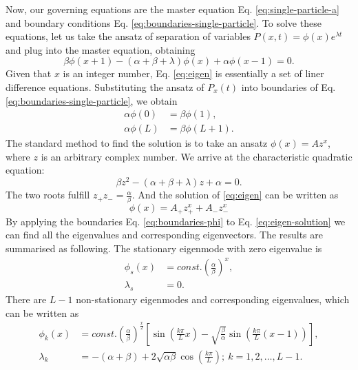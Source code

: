 Now, our governing equations are the master equation Eq. \eqref{eq:single-particle-a} and boundary conditions Eq. \eqref{eq:boundaries-single-particle}. To solve these equations, let us take the ansatz of separation of variables $P(x,t) = \phi(x)e^{\lambda t}$ and plug into the master equation, obtaining 
\begin{equation}
    \label{eq:eigen}
    \beta\phi(x+1) -(\alpha+\beta+\lambda)\phi(x) + \alpha\phi(x-1) = 0.
\end{equation}
Given that $x$ is an integer number, Eq. \eqref{eq:eigen} is essentially a set of liner difference equations. Substituting the ansatz of $P_x(t)$ into boundaries of Eq. \eqref{eq:boundaries-single-particle}, we obtain
\begin{subequations}
    \label{eq:boundaries-phi}
    \begin{align}
        \alpha\phi(0) &= \beta\phi(1), \\
        \alpha \phi(L) &= \beta \phi(L+1).
    \end{align}
\end{subequations}
The standard method to find the solution is to take an ansatz $\phi(x) = Az^x$, where $z$ is an arbitrary complex number. We arrive at the characteristic quadratic equation:
\begin{equation}
    \label{eq:characteristic}
    \beta z^2 - (\alpha + \beta + \lambda ) z + \alpha = 0.
\end{equation}
The two roots fulfill $z_+z_- = \frac{\alpha}{\beta}$. And the solution of \eqref{eq:eigen} can be written as 
\begin{equation}
    \label{eq:eigen-solution}
    \phi(x) = A_+ z_+^{x} + A_- z_-^{x}
\end{equation}
By applying the boundaries Eq. \eqref{eq:boundaries-phi} to Eq. \eqref{eq:eigen-solution} we can find all the eigenvalues and corresponding eigenvectors. The results are summarised as following. The stationary eigenmode with zero eigenvalue is
\begin{subequations}
    \label{eq:single-particle-stationary}
    \begin{align}
        \phi_s(x) & = const. \left(\frac{\alpha}{\beta}\right)^{x}, \\
        \lambda_s & = 0. 
    \end{align}
\end{subequations}
There are $L-1$ non-stationary eigenmodes and corresponding eigenvalues, which can be written as
\begin{subequations}
    \label{eq:single-particle-eigenmodes}
    \begin{align}
        \phi_k(x) & = const. \left(\frac{\alpha}{\beta}\right)^{\frac{x}{2}} \left[\sin\left(\frac{k\pi}{L}x\right) - \sqrt{\frac{\beta}{\alpha}}\sin\left(\frac{k\pi}{L}(x-1)\right)\right],\\
        \lambda_k & = -(\alpha+\beta) + 2\sqrt{\alpha\beta}\cos(\frac{k\pi}{L}); ~k=1,2,\dots, L-1.
    \end{align}
\end{subequations}


